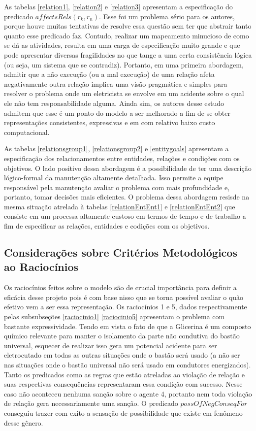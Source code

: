 As tabelas \ref{relation1}, \ref{relation2} e \ref{relation3} apresentam a especificação do predicado $affectsRels(r_k,r_n)$. Esse foi um problema sério para os autores, porque houve muitas tentativas de resolve essa questão sem ter que abstrair tanto quanto esse predicado faz. Contudo, realizar um mapeamento minucioso de como se dá as atividades, resulta em uma carga de especificação muito grande e que pode apresentar diversas fragilidades no que tange a uma certa consistência lógica (ou seja, um sistema que se contradiz). Portanto, em uma primeira abordagem, admitir que a não execução (ou a mal execução) de uma relação afeta negativamente outra relação implica uma visão pragmática e simples para resolver o problema onde um eletricista se envolve em um acidente sobre o qual ele não tem responsabilidade alguma. Ainda sim, os autores desse estudo admitem que esse é um ponto do modelo a ser melhorado a fim de se obter representações consistentes, expressivas e em com relativo baixo custo computacional. 

As tabelas \ref{relationsgroup1}, \ref{relationsgroup2} e \ref{entitygoals} apresentam a especificação dos relacionamentos entre entidades, relações e condições com os objetivos. O lado positivo dessa abordagem é a possibilidade de ter uma descrição lógico-formal da manutenção altamente detalhada. Isso permite a equipe responsável pela manutenção avaliar o problema com mais profundidade e, portanto, tomar decisões mais eficientes. O problema dessa abordagem resisde na mesma situação atrelada à tabelas \ref{relationEntEnt1} e \ref{relationEntEnt2} que consiste em um processa altamente custoso em termos de tempo e de trabalho a fim de especificar as relações, entidades e codições com os objetivos. 

\subsection{Considerações sobre Critérios Metodológicos ao Raciocínios} \label{conscritmetrac}

Os raciocínios feitos sobre o modelo são de crucial importância para definir a eficácia desse projeto pois é com base nisso que se torna possível avaliar o quão efetivo vem a ser essa representação. Os raciocínios 1 e 5, dados respectivamente pelas subsubseções \ref{raciocinio1} \ref{raciocinio5} apresentam o problema com bastante expressividade. Tendo em vista o fato de que a Glicerina  é um composto químico relevante para manter o isolamento da parte não condutiva do bastão universal, esquecer de realizar isso gera um potencial acidente para ser eletrocutado em todas as outras situações onde o bastão será usado (a não ser nas situações onde o bastão universal não será usado em condutores energizados). Tanto os predicados como as regras que estão atreladas ao violação de relação e suas respectivas consequências representaram essa condição com sucesso. Nesse caso não aconteceu nenhuma sanção sobre o agente 4, portanto nem toda violação de relação gera necessariamente uma sanção. O predicado $possOfNegConseqFor$ conseguiu trazer com exito a sensação de possibilidade que existe em fenômeno desse gênero. 

